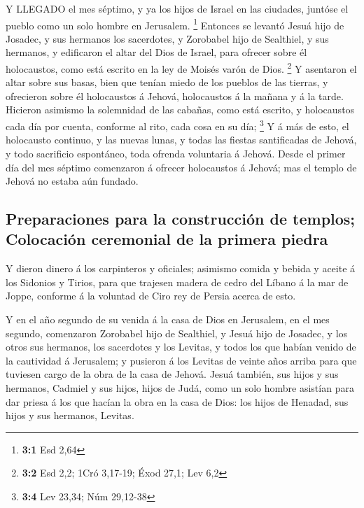  Y LLEGADO el mes séptimo, y ya los hijos de Israel en las
ciudades, juntóse el pueblo como un solo hombre en Jerusalem.
\footnote{\textbf{3:1} Esd 2,64}  Entonces se levantó Jesuá
hijo de Josadec, y sus hermanos los sacerdotes, y Zorobabel hijo de
Sealthiel, y sus hermanos, y edificaron el altar del Dios de Israel,
para ofrecer sobre él holocaustos, como está escrito en la ley de Moisés
varón de Dios. \footnote{\textbf{3:2} Esd 2,2; 1Cró 3,17-19; Éxod 27,1;
  Lev 6,2}  Y asentaron el altar sobre sus basas, bien que
tenían miedo de los pueblos de las tierras, y ofrecieron sobre él
holocaustos á Jehová, holocaustos á la mañana y á la tarde. 
Hicieron asimismo la solemnidad de las cabañas, como está escrito, y
holocaustos cada día por cuenta, conforme al rito, cada cosa en su día;
\footnote{\textbf{3:4} Lev 23,34; Núm 29,12-38}  Y á más de
esto, el holocausto continuo, y las nuevas lunas, y todas las fiestas
santificadas de Jehová, y todo sacrificio espontáneo, toda ofrenda
voluntaria á Jehová.  Desde el primer día del mes séptimo
comenzaron á ofrecer holocaustos á Jehová; mas el templo de Jehová no
estaba aún fundado.

\hypertarget{preparaciones-para-la-construcciuxf3n-de-templos-colocaciuxf3n-ceremonial-de-la-primera-piedra}{%
\subsection{Preparaciones para la construcción de templos; Colocación
ceremonial de la primera
piedra}\label{preparaciones-para-la-construcciuxf3n-de-templos-colocaciuxf3n-ceremonial-de-la-primera-piedra}}

 Y dieron dinero á los carpinteros y oficiales; asimismo
comida y bebida y aceite á los Sidonios y Tirios, para que trajesen
madera de cedro del Líbano á la mar de Joppe, conforme á la voluntad de
Ciro rey de Persia acerca de esto.

 Y en el año segundo de su venida á la casa de Dios en
Jerusalem, en el mes segundo, comenzaron Zorobabel hijo de Sealthiel, y
Jesuá hijo de Josadec, y los otros sus hermanos, los sacerdotes y los
Levitas, y todos los que habían venido de la cautividad á Jerusalem; y
pusieron á los Levitas de veinte años arriba para que tuviesen cargo de
la obra de la casa de Jehová.  Jesuá también, sus hijos y
sus hermanos, Cadmiel y sus hijos, hijos de Judá, como un solo hombre
asistían para dar priesa á los que hacían la obra en la casa de Dios:
los hijos de Henadad, sus hijos y sus hermanos, Levitas.

